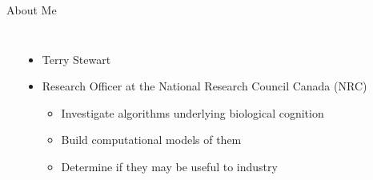 \documentclass[aspectratio=169]{beamer}
\begin{document}
\begin{frame}{About Me}
	\begin{columns}[T]
		\fboxrule=0.4pt\fboxsep=0pt\\
		\begin{itemize}
			\item Terry Stewart
			\item Research Officer at the National Research Council Canada (NRC)
			\begin{itemize}
				\item Investigate algorithms underlying biological cognition
				\item Build computational models of them
				\item Determine if they may be useful to industry

\end{itemize}
\end{itemize}
\end{columns}
\end{frame}
\end{document}
